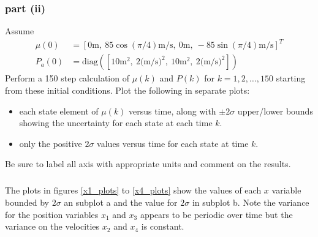\documentclass[11pt]{article}
\begin{document}
\subsubsection*{part (ii)}
Assume
\begin{align*}
	\mu(0) &= [0\text{m},\ 85\cos(\pi/4)\text{m/s},\ 0\text{m},\ -85\sin(\pi/4)\text{m/s}]^T \\
	P_a(0) &= \text{diag}([10\text{m}^2,\ 2\text{(m/s)}^2,\ 10\text{m}^2,\ 2\text{(m/s)}^2])
\end{align*}
Perform a 150 step calculation of $\mu(k)$ and $P(k)$ for $k=1,2,\dots,150$ starting from these initial conditions. Plot the following in separate plots:
\begin{itemize}
	\item each state element of $\mu(k)$ versus time, along with $\pm2\sigma$ upper/lower bounds showing the uncertainty for each state at each time $k$.
	\item only the positive $2\sigma$ values versus time for each state at time $k$.
\end{itemize}
Be sure to label all axis with appropriate units and comment on the results.

\subparagraph*{}
The plots in figures \ref{x1_plots} to \ref{x4_plots} show the values of each $x$ variable bounded by $2\sigma$ an subplot a and the value for $2\sigma$ in subplot b. Note the variance for the position variables $x_1$ and $x_3$ appears to be periodic over time but the variance on the velocities $x_2$ and $x_4$ is constant.
\end{document}
